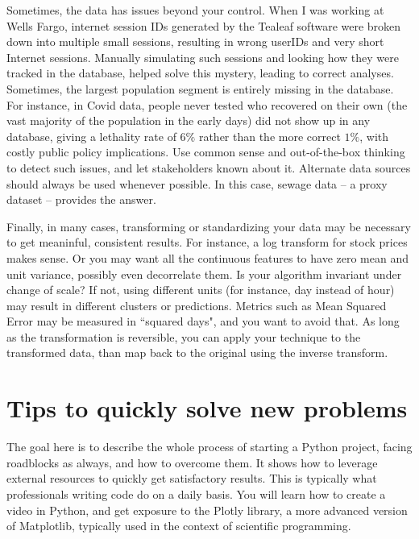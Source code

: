 \documentclass[oneside,10pt]{book}
\begin{document}
Sometimes, the data has issues beyond your control. When I was working at Wells Fargo, internet session IDs generated by the Tealeaf software were broken down into multiple small sessions, resulting in 
 wrong userIDs and very short Internet sessions. Manually simulating such sessions and looking how they were tracked in the database, helped solve this mystery, leading to correct analyses. Sometimes, the largest population segment is entirely missing in the database. For instance, in Covid data, people never tested who recovered on their own (the vast majority of the population in the early days) did not show up in any database, giving a lethality rate of $6\%$ rather than the more correct $1\%$, with costly public policy implications. Use common sense and out-of-the-box thinking to detect such issues, and let stakeholders known about it. Alternate data sources should always be used whenever possible. In this case, sewage data -- a proxy dataset -- provides the answer.

Finally, in many cases, transforming or standardizing your data may be necessary to get meaninful, consistent results. 
 For instance, a log transform for stock prices makes sense. Or you may want all the continuous features to have zero mean and unit variance, possibly even decorrelate them. Is your algorithm invariant under change of scale? If not, using different units (for instance, day instead of hour) may result in different clusters or predictions. Metrics such as \textcolor{index}{Mean Squared Error}  may be measured in ``squared days", and you want to avoid that. As long as the transformation is reversible, you can apply your technique to the transformed data, than map back to the original using the inverse transform. 

\section{Tips to quickly solve new problems}\label{tipsdfesd}


The goal here is to describe the whole process of starting a Python project, facing roadblocks as always, and how to overcome them. It shows how to leverage external resources to quickly get satisfactory results. This is typically what professionals writing code do on a daily basis. You will learn how to create a video in Python, and get exposure to the \textcolor{index}{Plotly} library, a more advanced version of Matplotlib, typically used in the context of scientific programming.
\end{document}
